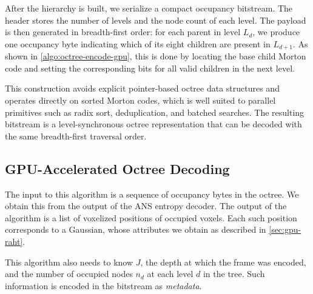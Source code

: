 After the hierarchy is built, we serialize a compact occupancy bitstream. 
%
The header stores the number of levels and the node count of each level. 
%
The payload is then generated in breadth-first order: for each parent in level $L_d$, we produce one occupancy byte indicating which of its eight children are present in $L_{d+1}$. 
%
As shown in \cref{algo:octree-encode-gpu}, this is done by locating the base child Morton code and setting the corresponding bits for all valid children in the next level.

This construction avoids explicit pointer-based octree data structures and operates directly on sorted Morton codes, which is well suited to parallel primitives such as radix sort, deduplication, and batched searches. 
%
The resulting bitstream is a level-synchronous octree representation that can be decoded with the same breadth-first traversal order.


\subsection{GPU-Accelerated Octree Decoding}\label{sec:octree-decode-gpu}

%
The input to this algorithm is a sequence of occupancy bytes in the octree.
%
We obtain this from the output of the ANS entropy decoder.
%
The output of the algorithm is a list of voxelized positions of occupied voxels.
%
Each such position corresponds to a Gaussian, whose attributes we obtain as described in \cref{sec:gpu-raht}.

This algorithm also needs to know $J$, the depth at which the \gs{} frame was encoded, and the number of occupied nodes $n_d$ at each level $d$ in the tree.
%
Such information is encoded in the bitstream as \textit{metadata}. 


